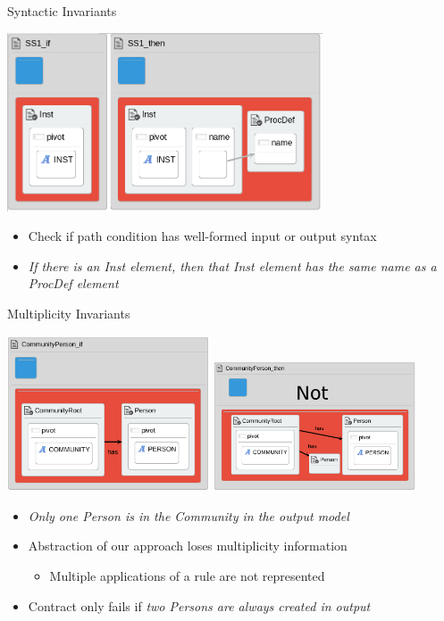 \documentclass[xcolor=dvipsnames, 12pt, handout]{beamer}
\begin{document}
\begin{frame}{Syntactic Invariants}
\begin{center}
\includegraphics[width=0.7\textwidth]{figures/syntactic_invariant}
\end{center}
\begin{itemize}
\item Check if path condition has well-formed input or output syntax
\item \textit{If there is an Inst element, then that Inst element has the same name as a ProcDef element}
\end{itemize}
\end{frame}

\begin{frame}{Multiplicity Invariants}
\begin{center}
\includegraphics[width=0.45\textwidth]{figures/communityPersonProp_if}
\includegraphics[width=0.45\textwidth]{figures/communityPersonProp_then}
\end{center}
\begin{itemize}
\item \textit{Only one Person is in the Community in the output model}
\end{itemize}
\begin{itemize}
\item Abstraction of our approach loses multiplicity information
\begin{itemize}
\item Multiple applications of a rule are not represented
\end{itemize}
\item Contract only fails if \textit{two Persons are always created in output}
\end{itemize}
\end{frame}
\end{document}

